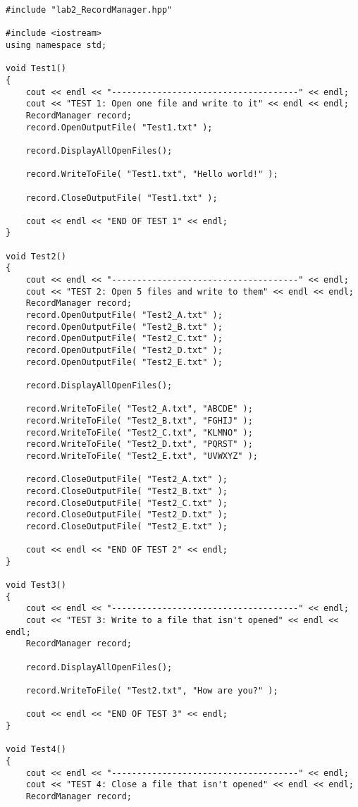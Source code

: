\documentclass[a4paper,12pt]{book}
\begin{document}
\begin{lstlisting}[style=code]
#include "lab2_RecordManager.hpp"

#include <iostream>
using namespace std;

void Test1()
{
    cout << endl << "-------------------------------------" << endl;
    cout << "TEST 1: Open one file and write to it" << endl << endl;
    RecordManager record;
    record.OpenOutputFile( "Test1.txt" );
    
    record.DisplayAllOpenFiles();
    
    record.WriteToFile( "Test1.txt", "Hello world!" );
    
    record.CloseOutputFile( "Test1.txt" );
    
    cout << endl << "END OF TEST 1" << endl;
}

void Test2()
{
    cout << endl << "-------------------------------------" << endl;
    cout << "TEST 2: Open 5 files and write to them" << endl << endl;
    RecordManager record;
    record.OpenOutputFile( "Test2_A.txt" );
    record.OpenOutputFile( "Test2_B.txt" );
    record.OpenOutputFile( "Test2_C.txt" );
    record.OpenOutputFile( "Test2_D.txt" );
    record.OpenOutputFile( "Test2_E.txt" );
    
    record.DisplayAllOpenFiles();
    
    record.WriteToFile( "Test2_A.txt", "ABCDE" );
    record.WriteToFile( "Test2_B.txt", "FGHIJ" );
    record.WriteToFile( "Test2_C.txt", "KLMNO" );
    record.WriteToFile( "Test2_D.txt", "PQRST" );
    record.WriteToFile( "Test2_E.txt", "UVWXYZ" );
    
    record.CloseOutputFile( "Test2_A.txt" );
    record.CloseOutputFile( "Test2_B.txt" );
    record.CloseOutputFile( "Test2_C.txt" );
    record.CloseOutputFile( "Test2_D.txt" );
    record.CloseOutputFile( "Test2_E.txt" );
    
    cout << endl << "END OF TEST 2" << endl;
}

void Test3()
{
    cout << endl << "-------------------------------------" << endl;
    cout << "TEST 3: Write to a file that isn't opened" << endl << endl;
    RecordManager record;
    
    record.DisplayAllOpenFiles();
    
    record.WriteToFile( "Test2.txt", "How are you?" );
    
    cout << endl << "END OF TEST 3" << endl;
}

void Test4()
{
    cout << endl << "-------------------------------------" << endl;
    cout << "TEST 4: Close a file that isn't opened" << endl << endl;
    RecordManager record;
    

\end{lstlisting}
\end{document}
